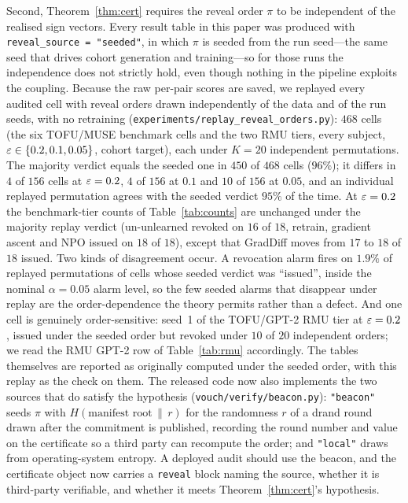 Second, Theorem~\ref{thm:cert} requires the reveal order $\pi$ to be independent of
the realised sign vectors. Every result table in this paper was produced with
\texttt{reveal\_source = "seeded"}, in which $\pi$ is seeded from the run seed---the
same seed that drives cohort generation and training---so for those runs the
independence does not strictly hold, even though nothing in the pipeline exploits the
coupling. Because the raw per-pair scores are saved, we replayed every audited cell
with reveal orders drawn independently of the data and of the run seeds, with no
retraining (\texttt{experiments/replay\_reveal\_orders.py}): $468$ cells (the six
TOFU/MUSE benchmark cells and the two RMU tiers, every subject, $\varepsilon\in\{0.2,0.1,0.05\}$,
cohort target), each under $K=20$ independent permutations. The majority verdict equals
the seeded one in $450$ of $468$ cells ($96\%$); it differs in $4$ of $156$ cells at
$\varepsilon=0.2$, $4$ of $156$ at $0.1$ and $10$ of $156$ at $0.05$, and an individual
replayed permutation agrees with the seeded verdict $95\%$ of the time. At
$\varepsilon=0.2$ the benchmark-tier counts of Table~\ref{tab:counts} are unchanged under the
majority replay verdict (un-unlearned revoked on $16$ of $18$, retrain, gradient
ascent and NPO issued on $18$ of $18$), except that GradDiff moves from $17$ to $18$
of $18$ issued. Two kinds of disagreement occur. A revocation alarm fires on
$1.9\%$ of replayed permutations of cells whose seeded verdict was ``issued'', inside
the nominal $\alpha=0.05$ alarm level, so the few seeded alarms that disappear under
replay are the order-dependence the theory permits rather than a defect. And one
cell is genuinely order-sensitive: seed~1 of the TOFU/GPT-2 RMU tier at $\varepsilon=0.2$,
issued under the seeded order but revoked under $10$ of $20$ independent orders; we
read the RMU GPT-2 row of Table~\ref{tab:rmu} accordingly. The tables themselves are
reported as originally computed under the seeded order, with this replay as the
check on them. The released code now also implements the two sources that do
satisfy the hypothesis (\texttt{vouch/verify/beacon.py}): \texttt{"beacon"} seeds $\pi$
with $H(\text{manifest root} \,\|\, r)$ for the randomness $r$ of a drand round drawn
after the commitment is published, recording the round number and value on the
certificate so a third party can recompute the order; and \texttt{"local"} draws from
operating-system entropy. A deployed audit should use the beacon, and the certificate
object now carries a \texttt{reveal} block naming the source, whether it is
third-party verifiable, and whether it meets Theorem~\ref{thm:cert}'s hypothesis.

